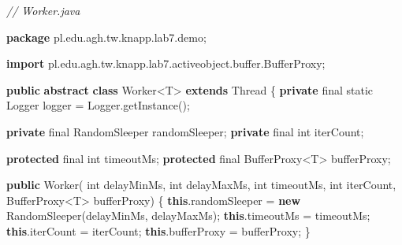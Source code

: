 \documentclass[11pt]{article}
\newenvironment{Shaded}{}{}
\newcommand{\KeywordTok}[1]{\textcolor[rgb]{0.00,0.44,0.13}{\textbf{{#1}}}}
\newcommand{\DataTypeTok}[1]{\textcolor[rgb]{0.56,0.13,0.00}{{#1}}}
\newcommand{\CommentTok}[1]{\textcolor[rgb]{0.38,0.63,0.69}{\textit{{#1}}}}
\newcommand{\FunctionTok}[1]{\textcolor[rgb]{0.02,0.16,0.49}{{#1}}}
\newcommand{\NormalTok}[1]{{#1}}
\newcommand{\ImportTok}[1]{{#1}}
\newcommand{\OperatorTok}[1]{\textcolor[rgb]{0.40,0.40,0.40}{{#1}}}
\newcommand{\BuiltInTok}[1]{{#1}}
\begin{document}
\begin{Shaded}
\begin{Highlighting}[]
\CommentTok{// Worker.java}

\KeywordTok{package}\ImportTok{ pl}\OperatorTok{.}\ImportTok{edu}\OperatorTok{.}\ImportTok{agh}\OperatorTok{.}\ImportTok{tw}\OperatorTok{.}\ImportTok{knapp}\OperatorTok{.}\ImportTok{lab7}\OperatorTok{.}\ImportTok{demo}\OperatorTok{;}

\KeywordTok{import} \ImportTok{pl}\OperatorTok{.}\ImportTok{edu}\OperatorTok{.}\ImportTok{agh}\OperatorTok{.}\ImportTok{tw}\OperatorTok{.}\ImportTok{knapp}\OperatorTok{.}\ImportTok{lab7}\OperatorTok{.}\ImportTok{activeobject}\OperatorTok{.}\ImportTok{buffer}\OperatorTok{.}\ImportTok{BufferProxy}\OperatorTok{;}

\KeywordTok{public} \KeywordTok{abstract} \KeywordTok{class}\NormalTok{ Worker}\OperatorTok{\textless{}}\NormalTok{T}\OperatorTok{\textgreater{}} \KeywordTok{extends} \BuiltInTok{Thread} \OperatorTok{\{}
    \KeywordTok{private} \DataTypeTok{final} \DataTypeTok{static} \BuiltInTok{Logger}\NormalTok{ logger }\OperatorTok{=} \BuiltInTok{Logger}\OperatorTok{.}\FunctionTok{getInstance}\OperatorTok{();}

    \KeywordTok{private} \DataTypeTok{final}\NormalTok{ RandomSleeper randomSleeper}\OperatorTok{;}
    \KeywordTok{private} \DataTypeTok{final} \DataTypeTok{int}\NormalTok{ iterCount}\OperatorTok{;}

    \KeywordTok{protected} \DataTypeTok{final} \DataTypeTok{int}\NormalTok{ timeoutMs}\OperatorTok{;}
    \KeywordTok{protected} \DataTypeTok{final}\NormalTok{ BufferProxy}\OperatorTok{\textless{}}\NormalTok{T}\OperatorTok{\textgreater{}}\NormalTok{ bufferProxy}\OperatorTok{;}

    \KeywordTok{public} \FunctionTok{Worker}\OperatorTok{(}
        \DataTypeTok{int}\NormalTok{ delayMinMs}\OperatorTok{,} \DataTypeTok{int}\NormalTok{ delayMaxMs}\OperatorTok{,}
        \DataTypeTok{int}\NormalTok{ timeoutMs}\OperatorTok{,} \DataTypeTok{int}\NormalTok{ iterCount}\OperatorTok{,}
\NormalTok{        BufferProxy}\OperatorTok{\textless{}}\NormalTok{T}\OperatorTok{\textgreater{}}\NormalTok{ bufferProxy}\OperatorTok{)}
    \OperatorTok{\{}
        \KeywordTok{this}\OperatorTok{.}\FunctionTok{randomSleeper} \OperatorTok{=} \KeywordTok{new} \FunctionTok{RandomSleeper}\OperatorTok{(}\NormalTok{delayMinMs}\OperatorTok{,}\NormalTok{ delayMaxMs}\OperatorTok{);}
        \KeywordTok{this}\OperatorTok{.}\FunctionTok{timeoutMs} \OperatorTok{=}\NormalTok{ timeoutMs}\OperatorTok{;}
        \KeywordTok{this}\OperatorTok{.}\FunctionTok{iterCount} \OperatorTok{=}\NormalTok{ iterCount}\OperatorTok{;}
        \KeywordTok{this}\OperatorTok{.}\FunctionTok{bufferProxy} \OperatorTok{=}\NormalTok{ bufferProxy}\OperatorTok{;}
    \OperatorTok{\}}


\end{Highlighting}
\end{Shaded}
\end{document}
